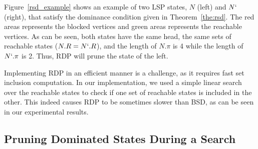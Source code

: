 \documentclass[letterpaper]{article} %
\newcommand\AF[1]{\nb{\textbf{Ariel:}}{red}{#1}}
\newcommand\Yossi[1]{\nb{\textbf{Yossi:}}{green}{#1}}
\newcommand\Roni[1]{\nb{\textbf{Roni:}}{blue}{#1}}
\begin{document}
Figure~\ref{rsd_example} shows an example of two LSP states, $N$ (left) and $N`$ (right), that satisfy the dominance condition given in Theorem~\ref{the:rsd}.
The red areas represents the blocked vertices and green areas represents the reachable vertices.
As can be seen, both states have the same head,
the same sets of reachable states ($N.R=N`.R$),
and the length of $N.\pi$ is 4 while the length of $N`.\pi$ is 2. Thus, RDP will prune the state of the left.



Implementing RDP in an efficient manner is a challenge, as it requires fast set inclusion computation. In our implementation, we used a simple linear search over the reachable states to check if one set of reachable states is included in the other. This indeed causes RDP to be sometimes slower than BSD, as can be seen in our experimental results.



\subsection{Pruning Dominated States During a Search}
\end{document}
